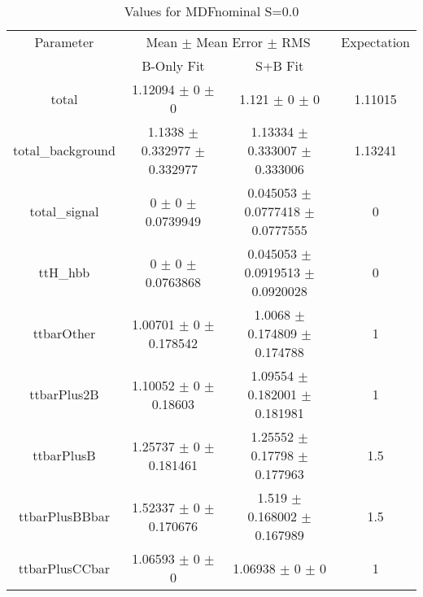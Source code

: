 \begin{table}
\centering
\caption{Values for MDFnominal S=0.0}
\begin{tabular}{cccc}
\toprule
Parameter & \multicolumn{2}{c}{Mean $\pm$ Mean Error $\pm$ RMS} & Expectation\\
 & B-Only Fit & S+B Fit & \\
\midrule
total & \num{1.12094} $\pm$ \num{0} $\pm$ \num{0} & \num{1.121} $\pm$ \num{0} $\pm$ \num{0} & \num{1.11015}\\
total\_background & \num{1.1338} $\pm$ \num{0.332977} $\pm$ \num{0.332977} & \num{1.13334} $\pm$ \num{0.333007} $\pm$ \num{0.333006} & \num{1.13241}\\
total\_signal & \num{0} $\pm$ \num{0} $\pm$ \num{0.0739949} & \num{0.045053} $\pm$ \num{0.0777418} $\pm$ \num{0.0777555} & \num{0}\\
ttH\_hbb & \num{0} $\pm$ \num{0} $\pm$ \num{0.0763868} & \num{0.045053} $\pm$ \num{0.0919513} $\pm$ \num{0.0920028} & \num{0}\\
ttbarOther & \num{1.00701} $\pm$ \num{0} $\pm$ \num{0.178542} & \num{1.0068} $\pm$ \num{0.174809} $\pm$ \num{0.174788} & \num{1}\\
ttbarPlus2B & \num{1.10052} $\pm$ \num{0} $\pm$ \num{0.18603} & \num{1.09554} $\pm$ \num{0.182001} $\pm$ \num{0.181981} & \num{1}\\
ttbarPlusB & \num{1.25737} $\pm$ \num{0} $\pm$ \num{0.181461} & \num{1.25552} $\pm$ \num{0.17798} $\pm$ \num{0.177963} & \num{1.5}\\
ttbarPlusBBbar & \num{1.52337} $\pm$ \num{0} $\pm$ \num{0.170676} & \num{1.519} $\pm$ \num{0.168002} $\pm$ \num{0.167989} & \num{1.5}\\
ttbarPlusCCbar & \num{1.06593} $\pm$ \num{0} $\pm$ \num{0} & \num{1.06938} $\pm$ \num{0} $\pm$ \num{0} & \num{1}\\
\bottomrule
\end{tabular}
\end{table}